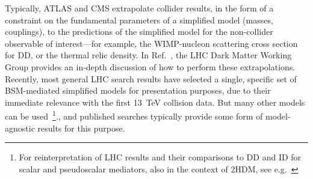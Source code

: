 
Typically, ATLAS and CMS extrapolate collider results, in the form of a constraint on the fundamental parameters of a simplified model (masses, couplings), to the predictions of the simplified model for the non-collider observable of interest---for example, the WIMP-nucleon scattering cross section for DD, or the thermal relic density. In Ref.~\cite{Boveia:2016mrp}, the LHC Dark Matter Working Group provides an in-depth discussion of how to perform these extrapolations. Recently, most general LHC search results have selected a single, specific set of BSM-mediated simplified models for presentation purposes, due to their immediate relevance with the first 13~TeV collision data. But many other models can be used~\footnote{For reinterpretation of LHC results and their comparisons to DD and ID for scalar and pseudoscalar mediators, also in the context of 2HDM, see e.g.~\cite{Athron:2017kgt,Banerjee:2017wxi,Ipek:2014gua,Bell:2016ekl}}., and published searches typically provide some form of model-agnostic results for this purpose.


